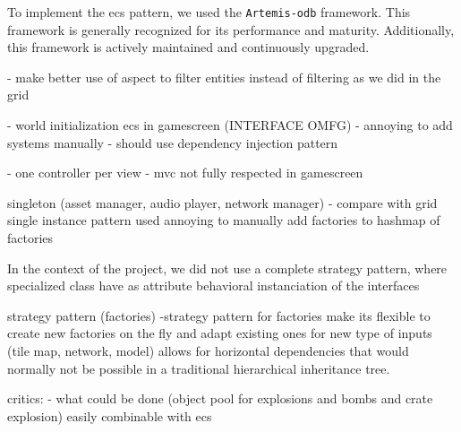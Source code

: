 
To implement the \gls{ecs} pattern, we used the \texttt{Artemis-odb} framework.\cite{artemis-odb} This framework is generally recognized for its performance and maturity. Additionally, this framework is actively maintained and continuously upgraded.

- make better use of aspect to filter entities instead of filtering as we did in the grid

- world initialization ecs in gamescreen (INTERFACE OMFG)
- annoying to add systems manually
- should use dependency injection pattern


- one controller per view
- mvc not fully respected in gamescreen


singleton (asset manager, audio player, network manager)
- compare with grid single instance pattern used
annoying to manually add factories to hashmap of factories


In the context of the project, we did not use a complete strategy pattern, where specialized class have as attribute behavioral instanciation of the interfaces

strategy pattern (factories)
-strategy pattern for factories make its flexible to create new factories on the fly and adapt existing ones for new type of inputs (tile map, network, model) allows for horizontal dependencies that would normally not be possible in a traditional hierarchical inheritance tree.

critics:
- what could be done (object pool for explosions and bombs and crate explosion) easily combinable with ecs

